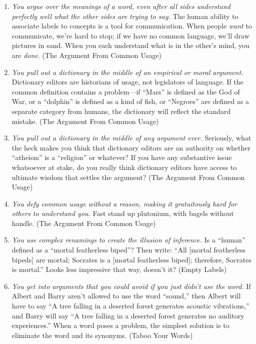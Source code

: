 {{\begin{enumerate}
\item {
 \textit{You argue over the meanings of a word, even after all
sides understand perfectly well what the other sides are trying to
say.} The human ability to associate labels to concepts is a tool for
communication. When people \textit{want} to communicate,
we're hard to stop; if we have no common language,
we'll draw pictures in sand. When you each understand
what is in the other's mind, you are \textit{done}.
(The Argument From Common Usage)}

\item {
 \textit{You pull out a dictionary in the middle of an empirical or
moral argument.} Dictionary editors are historians of usage, not
legislators of language. If the common definition contains a
problem---if ``Mars'' is defined as
the God of War, or a ``dolphin'' is
defined as a kind of fish, or
``Negroes'' are defined as a
separate category from humans, the dictionary will reflect the standard
mistake. (The Argument From Common Usage)}

\item {
 \textit{You pull out a dictionary in the middle of any argument
ever.} Seriously, what the heck makes you think that dictionary editors
are an authority on whether
``atheism'' is a
``religion'' or whatever? If you
have any substantive issue whatsoever at stake, do you really think
dictionary editors have access to ultimate wisdom that settles the
argument? (The Argument From Common Usage)}

\item {
 \textit{You defy common usage without a reason, making it
gratuitously hard for others to understand you.} Fast stand up
plutonium, with bagels without handle. (The Argument From Common
Usage)}

\item {
 \textit{You use complex renamings to create the illusion of
inference.} Is a ``human'' defined
as a ``mortal featherless biped''?
Then write: ``All [mortal featherless bipeds] are
mortal; Socrates is a [mortal featherless biped]; therefore, Socrates
is mortal.'' Looks less impressive that way,
doesn't it? (Empty Labels)}

\item {
 \textit{You get into arguments that you could avoid if you just
didn't use the word.} If Albert and Barry
aren't allowed to use the word
``sound,'' then Albert will have to
say ``A tree falling in a deserted forest generates
acoustic vibrations,'' and Barry will say
``A tree falling in a deserted forest generates no
auditory experiences.'' When a word poses a problem,
the simplest solution is to eliminate the word and its synonyms. (Taboo
Your Words)}


\end{enumerate}}}

